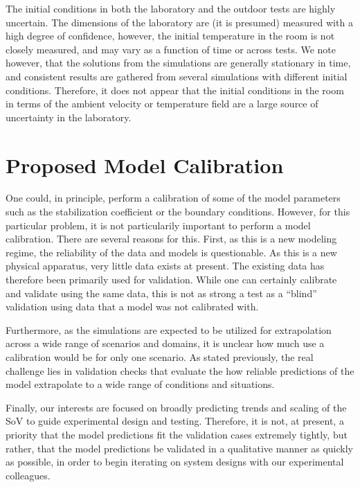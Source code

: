 \documentclass{article}
\begin{document}
The initial conditions in both the laboratory and the outdoor
tests are highly uncertain. The dimensions of the laboratory are
(it is presumed) measured with a high degree of confidence, however, the
initial temperature 
in the room is not closely measured, and may vary as a function of
time or across tests. We note however, that the solutions from the simulations are
generally stationary in time, and consistent results are gathered from several
simulations with different initial conditions. Therefore, it does not
appear that the initial conditions in the room in terms of the ambient
velocity or temperature field are a large source of uncertainty in the
laboratory.

%
%

\section{Proposed Model Calibration}

One could, in principle, perform a calibration of some of the model
parameters such as the stabilization coefficient or the boundary
conditions. However, for this particular problem, it is not particularily important to
perform a model calibration. There are several reasons for this. First,
as this is a new modeling regime, the reliability of the data and models
is questionable. As this is a new physical apparatus, very little data
exists at present. The existing data has therefore been
primarily used for validation. While one can certainly
calibrate and validate using the same data, this is not as strong a test 
as a ``blind'' validation using data that a model was not calibrated with. 

Furthermore, as the simulations are expected to be utilized for
extrapolation across a wide range of scenarios and domains, it is
unclear how much use a calibration would be for only one scenario. As
stated previously, the real challenge lies in validation checks that
evaluate the how reliable predictions of the model extrapolate to a wide
range of conditions and situations. 

Finally, our interests are focused on broadly predicting trends and
scaling of the SoV to guide experimental design and testing. Therefore,
it is not, at present, a priority that the model predictions fit the validation
cases extremely tightly, but rather, that the model predictions be
validated in a qualitative manner as quickly as possible, in order to
begin iterating on system designs with our experimental colleagues. 
\end{document}
